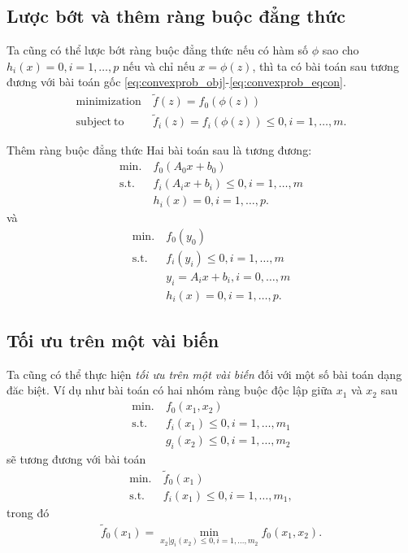 \documentclass{book}
\begin{document}
\subsection*{Lược bớt và thêm ràng buộc đẳng thức}
Ta cũng có thể lược bớt ràng buộc đẳng thức nếu có hàm số $\phi$ sao cho $h_i(x) = 0,  i = 1, \ldots, p$ nếu và chỉ nếu $x = \phi(z)$, thì ta có bài toán sau tương đương với bài toán gốc \eqref{eq:convexprob_obj}-\eqref{eq:convexprob_eqcon}.
\begin{align*}
\mathrm{minimization}~ & \tilde{f}(z) = f_0(\phi(z)) \\
\mathrm{subject ~ to}~ & \tilde{f}_i (z)  = f_i(\phi(z)) \leq 0, i = 1, \ldots, m.
\end{align*}

Thêm ràng buộc đẳng thức
Hai bài toán sau là tương đương:
\begin{align*}
\mathrm{min.}~ & f_0(A_0 x + b_0)\\
\mathrm{s.t.}~ & f_i(A_i x + b_i) \leq 0, i = 1, \ldots, m \\
			& h_i(x) = 0, i = 1, \ldots, p.
\end{align*}
và
\begin{align*}
\mathrm{min.}~ & f_0(y_0)\\
\mathrm{s.t.}~ & f_i(y_i) \leq 0, i = 1, \ldots, m \\
			& y_i = A_i x + b_i, i = 0, \ldots, m \\
			& h_i(x) = 0, i = 1, \ldots, p.
\end{align*}

\subsection*{Tối ưu trên một vài biến}
Ta cũng có thể thực hiện \textit{tối ưu trên một vài biến} đối với một số bài toán dạng đăc biệt. Ví dụ như bài toán có hai nhóm ràng buộc độc lập giữa $x_1$ và $x_2$ sau
\begin{align*}
\mathrm{min.}~ & f_0(x_1, x_2)\\
\mathrm{s.t.}~ & f_i(x_1) \leq 0, i = 1, \ldots, m_1\\
				& g_i(x_2) \leq 0, i = 1, \ldots, m_2
\end{align*}
sẽ tương đương với bài toán
\begin{align*}
\mathrm{min.}~ & \tilde{f}_0(x_1)\\
\mathrm{s.t.}~ & f_i(x_1) \leq 0, i = 1, \ldots, m_1,
\end{align*}
trong đó
\begin{align*}
\tilde{f}_0(x_1) = \min_{x_2 | g_i(x_2) \leq 0, i = 1,...,m_2} f_0(x_1, x_2).
\end{align*}
\end{document}
